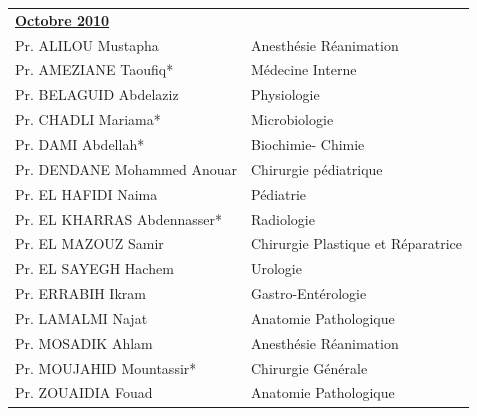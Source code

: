 \begin{table}[H]
\begin{tabular}{l l}
  \multicolumn{2}{l}{\textbf{\underline{Octobre 2010}}}\vspace*{0.5em}\\

  Pr. ALILOU Mustapha & \hspace*{2em} Anesthésie Réanimation\\       
  Pr. AMEZIANE Taoufiq* & \hspace*{2em} Médecine Interne\\
  Pr. BELAGUID Abdelaziz & \hspace*{2em} Physiologie\\
  Pr. CHADLI Mariama* & \hspace*{2em} Microbiologie\\       
  Pr. DAMI Abdellah* & \hspace*{2em} Biochimie- Chimie \\
  Pr. DENDANE Mohammed Anouar & \hspace*{2em} Chirurgie pédiatrique\\
  Pr. EL HAFIDI Naima	& \hspace*{2em} Pédiatrie\\       
  Pr. EL KHARRAS Abdennasser* & \hspace*{2em} Radiologie\\
  Pr. EL MAZOUZ Samir & \hspace*{2em} Chirurgie Plastique et Réparatrice\\
  Pr. EL SAYEGH Hachem & \hspace*{2em} Urologie \\       
  Pr. ERRABIH Ikram	 & \hspace*{2em} Gastro-Entérologie\\
  Pr. LAMALMI Najat & \hspace*{2em} Anatomie Pathologique\\
  Pr. MOSADIK Ahlam	 & \hspace*{2em} Anesthésie Réanimation\\       
  Pr. MOUJAHID Mountassir*	& \hspace*{2em} Chirurgie Générale\\
  Pr. ZOUAIDIA Fouad	& \hspace*{2em} Anatomie Pathologique\\

\end{tabular}
\end{table}


